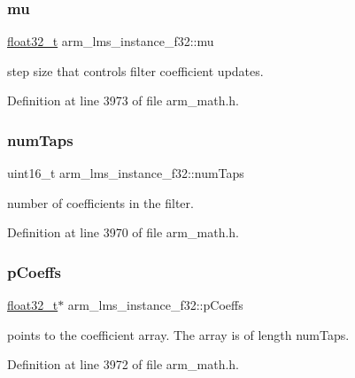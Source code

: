 \subsubsection{\texorpdfstring{mu}{mu}}
{\footnotesize\ttfamily \hyperlink{arm__math_8h_a4611b605e45ab401f02cab15c5e38715}{float32\+\_\+t} arm\+\_\+lms\+\_\+instance\+\_\+f32\+::mu}

step size that controls filter coefficient updates. 

Definition at line 3973 of file arm\+\_\+math.\+h.

\mbox{\label{structarm__lms__instance__f32_af73880d9009982f5d14529869494ec3d}} 
\subsubsection{\texorpdfstring{num\+Taps}{numTaps}}
{\footnotesize\ttfamily uint16\+\_\+t arm\+\_\+lms\+\_\+instance\+\_\+f32\+::num\+Taps}

number of coefficients in the filter. 

Definition at line 3970 of file arm\+\_\+math.\+h.

\mbox{\label{structarm__lms__instance__f32_a4795c6f7d3f17cec15c2fd09f66edd1a}} 
\subsubsection{\texorpdfstring{p\+Coeffs}{pCoeffs}}
{\footnotesize\ttfamily \hyperlink{arm__math_8h_a4611b605e45ab401f02cab15c5e38715}{float32\+\_\+t}$\ast$ arm\+\_\+lms\+\_\+instance\+\_\+f32\+::p\+Coeffs}

points to the coefficient array. The array is of length num\+Taps. 

Definition at line 3972 of file arm\+\_\+math.\+h.

\mbox{\label{structarm__lms__instance__f32_aaf94285be2f99b5b9af40bea8dcb14b9}} 
